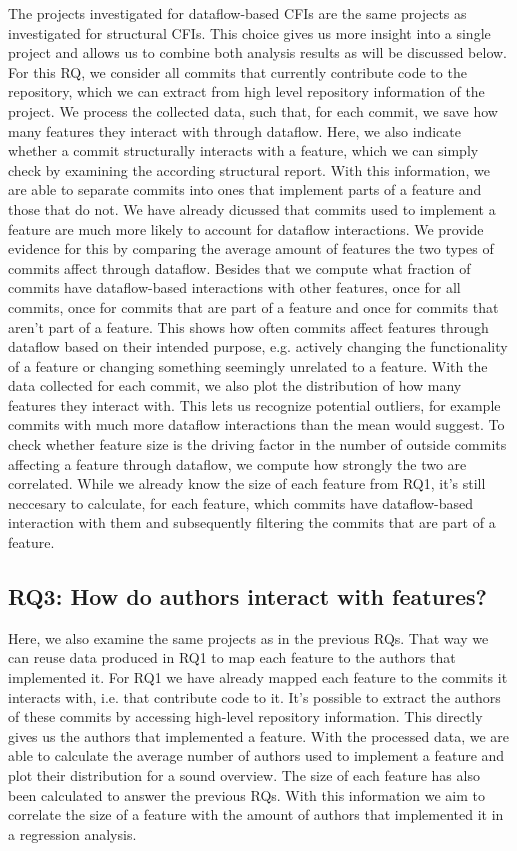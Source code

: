 The projects investigated for dataflow-based CFIs are the same projects as investigated for structural CFIs.
This choice gives us more insight into a single project and allows us to combine both analysis results as will be discussed below.
For this RQ, we consider all commits that currently contribute code to the repository, 
which we can extract from high level repository information of the project.
We process the collected data, such that, for each commit, we save how many features they interact with through dataflow.
Here, we also indicate whether a commit structurally interacts with a feature, which we can simply check by examining the according structural report.
With this information, we are able to separate commits into ones that implement parts of a feature and those that do not. 
We have already dicussed that commits used to implement a feature are much more likely to account for dataflow interactions.
We provide evidence for this by comparing the average amount of features the two types of commits affect through dataflow. 
Besides that we compute what fraction of commits have dataflow-based interactions with other features, once for all commits, once for commits that are part of a feature and once for commits that aren't part of a feature.
This shows how often commits affect features through dataflow based on their intended purpose, e.g. actively changing the functionality of a feature or changing something seemingly unrelated to a feature. 
With the data collected for each commit, we also plot the distribution of how many features they interact with.
This lets us recognize potential outliers, for example commits with much more dataflow interactions than the mean would suggest.
To check whether feature size is the driving factor in the number of outside commits affecting a feature through dataflow, we compute how strongly the two are correlated.
While we already know the size of each feature from RQ1, it's still neccesary to calculate, for each feature, which commits have dataflow-based interaction with them and subsequently filtering the commits that are part of a feature.

\subsection*{\textbf{RQ3: How do authors interact with features?}}

Here, we also examine the same projects as in the previous RQs.
That way we can reuse data produced in RQ1 to map each feature to the authors that implemented it.
For RQ1 we have already mapped each feature to the commits it interacts with, i.e. that contribute code to it.
It's possible to extract the authors of these commits by accessing high-level repository information.
This directly gives us the authors that implemented a feature.
With the processed data, we are able to calculate the average number of authors used to implement a feature and plot their distribution for a sound overview.
The size of each feature has also been calculated to answer the previous RQs.
With this information we aim to correlate the size of a feature with the amount of authors that implemented it in a regression analysis.
